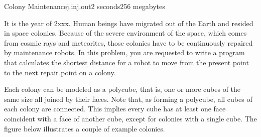 \begin{problem}
{Colony Maintenance}{j.in}{j.out}{2 seconds}{256 megabytes}

It is the year of 2xxx. 
Human beings have migrated out of the Earth and resided in space colonies. 
Because of the severe environment of the space, which comes from cosmic rays and meteorites, those colonies have to be continuously repaired by maintenance robots. 
In this problem, you are requested to write a program that calculates the shortest distance for a robot to move from the present point to the next repair point on a colony.

Each colony can be modeled as a polycube, that is, one or more cubes of the same size all joined by their faces. 
Note that, as forming a polycube, all cubes of each colony are connected. 
This implies every cube has at least one face coincident with a face of another cube, except for colonies with a single cube. 
The figure below illustrates a couple of example colonies.


\end{problem}
